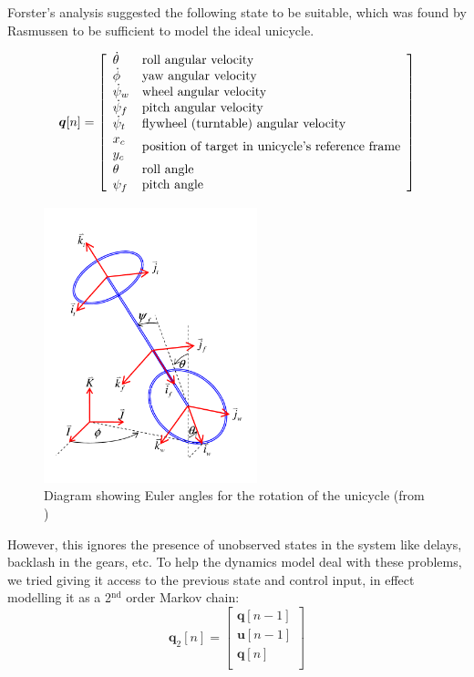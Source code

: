 \documentclass{IIBproject}
\begin{document}
Forster's analysis suggested the following state to be suitable, which was
found by Rasmussen to be sufficient to model the ideal unicycle.

\[
\boldsymbol{q}[n] = \left[ \begin{array}{ll}
  \dot{\theta} & \textrm{roll angular velocity} \\
  \dot{\phi} & \textrm{yaw angular velocity} \\
  \dot{\psi}_w & \textrm{wheel angular velocity} \\
  \dot{\psi}_f & \textrm{pitch angular velocity} \\
  \dot{\psi}_t & \textrm{flywheel (turntable) angular velocity} \\
  x_c & \multirow{2}{*}{\textrm{position of target in unicycle's reference
  frame}} \\
  y_c & \\
  \theta & \textrm{roll angle} \\
  \psi_f & \textrm{pitch angle} \\
\end{array}\right]
\]

\begin{figure}[htbp]
  \begin{center}
    \includegraphics[height=8cm]{figures/angles.pdf}
    \end{center}
    \caption{Diagram showing Euler angles for the rotation of the unicycle
    (from \cite{ref:forster})}
    \label{fig:unicycle_angles}
    \end{figure}

However, this ignores the presence of unobserved states in the system like
delays, backlash in the gears, etc. To help the dynamics model deal with these
problems, we tried giving it access to the previous state and control input,
in effect modelling it as a 2$^\textrm{nd}$ order Markov chain:
\[
  \boldsymbol{q}_2[n] = \left[ \begin{array}{l}
    \boldsymbol{q}[n-1] \\
    \boldsymbol{u}[n-1] \\
    \boldsymbol{q}[n] \\
  \end{array} \right]
\]
\end{document}
